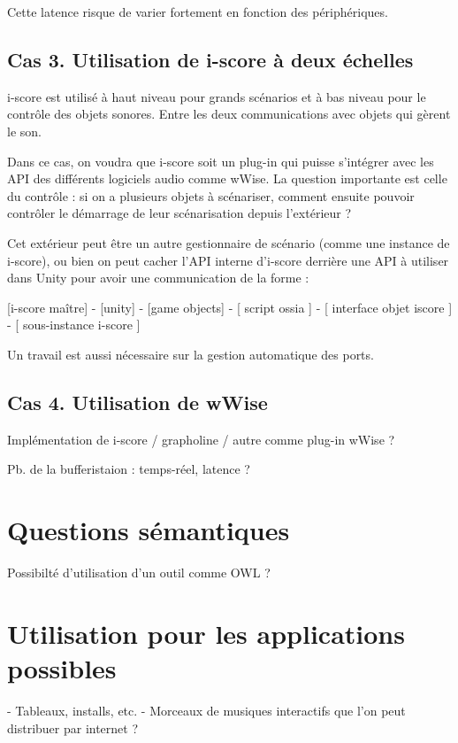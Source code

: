 \documentclass[french,12pt,a4paper]{article}
\begin{document}
Cette latence risque de varier fortement en fonction des périphériques. 

\subsection{Cas 3. Utilisation de i-score à deux échelles}
i-score est utilisé à haut niveau pour grands scénarios et à bas niveau pour le contrôle des objets sonores.
Entre les deux communications avec objets qui gèrent le son.

Dans ce cas, on voudra que i-score soit un plug-in qui puisse s'intégrer avec les API des différents logiciels audio 
comme wWise.
La question importante est celle du contrôle : si on a plusieurs objets à scénariser, comment 
ensuite pouvoir contrôler le démarrage de leur scénarisation depuis l'extérieur ? 

Cet extérieur peut être un autre gestionnaire de scénario (comme une instance de i-score), ou bien 
on peut cacher l'API interne d'i-score derrière une API à utiliser dans Unity pour avoir une communication de la forme : 

\begin{figure}
	
	\end{figure}
[i-score maître] - [unity] - [game objects] - [ script ossia ] - [ interface objet iscore ] - [ sous-instance i-score ]

Un travail est aussi nécessaire sur la gestion automatique des ports.
\subsection{Cas 4. Utilisation de wWise }
Implémentation de i-score / grapholine / autre comme plug-in wWise ?

Pb. de la bufferistaion : temps-réel, latence ?

\section{Questions sémantiques}
Possibilté d'utilisation d'un outil comme OWL ?

\section{Utilisation pour les applications possibles}
- Tableaux, installs, etc.
- Morceaux de musiques interactifs que l'on peut distribuer par internet ?
\end{document}
